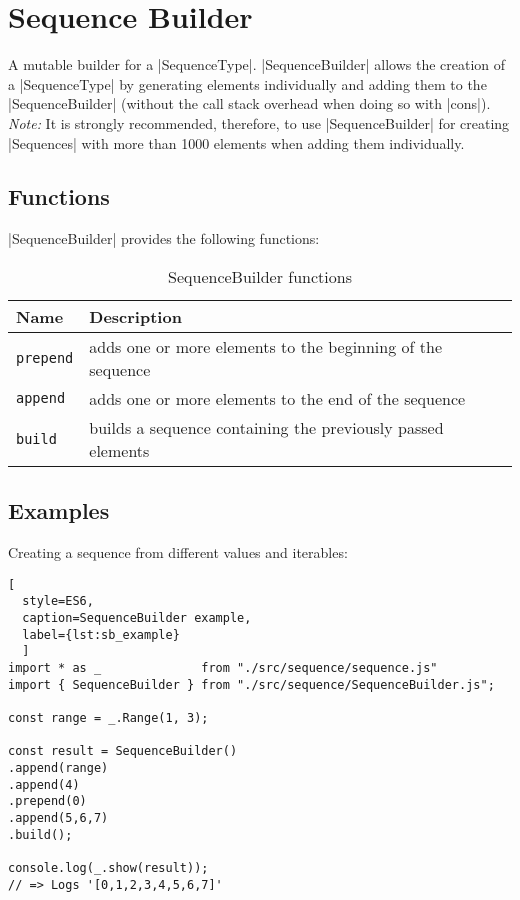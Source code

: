 \section{Sequence Builder}
\label{sec:Sequence Builder}
A mutable builder for a |SequenceType|.
\newline
|SequenceBuilder| allows the creation of a |SequenceType| by generating elements individually 
and adding them to the |SequenceBuilder| (without the call stack overhead when doing so
with |cons|).
\newline
\textit{Note:} It is strongly recommended, therefore, to use |SequenceBuilder|
for creating |Sequences| with more than 1000 elements when adding them
individually.

\subsection{Functions}
\label{sub:sb_Functions}

|SequenceBuilder| provides the following functions:

\begin{table}[H]
  \centering
  \begin{tabularx}{\textwidth}{| l | X |} \hline
    \textbf{Name}    & \textbf{Description} \\ \hline
    \texttt{prepend} & adds one or more elements to the beginning of the sequence\\ \hline 
    \texttt{append}  & adds one or more elements to the end of the sequence\\ \hline 
    \texttt{build}   & builds a sequence containing the previously passed elements \\ \hline 
   \end{tabularx}
  \caption{SequenceBuilder functions}
  \label{tab:sb_functions}
\end{table}

\subsection{Examples}
\label{sub:sb_Examples}
Creating a sequence from different values and iterables:

\begin{lstlisting}[
  style=ES6, 
  caption=SequenceBuilder example,
  label={lst:sb_example}
  ]
import * as _              from "./src/sequence/sequence.js"
import { SequenceBuilder } from "./src/sequence/SequenceBuilder.js";

const range = _.Range(1, 3);

const result = SequenceBuilder()
.append(range)
.append(4)
.prepend(0)
.append(5,6,7)
.build();

console.log(_.show(result));
// => Logs '[0,1,2,3,4,5,6,7]'
\end{lstlisting}
